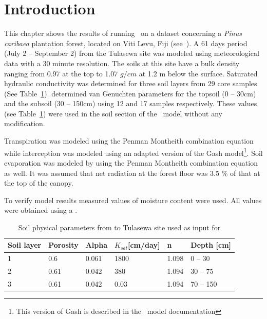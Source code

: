 \section{Introduction}
This chapter shows the results of running \vamps\ on a dataset
concerning a {\em Pinus caribaea} plantation forest, located on Viti
Levu, Fiji (see~). A 61 days period (July 2
-- September 2) from the Tulasewa site was modeled using
meteorological data with a 30 minute resolution. The soils at this
site have a bulk density ranging from 0.97 at the top to 1.07 $g/cm$
at 1.2 m below the surface. Saturated hydraulic conductivity was
determined for three soil layers from 29 core samples (See
Table~\ref{tab:tul-soil}).  determined van
Genuchten parameters for the topsoil (0 -- 30cm) and the subsoil (30
-- 150cm) using 12 and 17 samples respectively. These values (see
Table~\ref{tab:tul-soil}) were used in the soil section of the \vamps\
model without any modification.

Transpiration was modeled using the Penman Montheith combination
equation while interception was modeled using an adapted version of
the Gash model\footnote{This version of Gash is described in the
\vamps\ model documentation}. Soil evaporation was modeled by using
the Penman Montheith combination equation as well. It was assumed that
net radiation at the forest floor was 3.5 \% of that at the top
of the canopy. 


To verify model results measured values of moisture content were used.
All values were obtained using a \Index{capacitance probe}. 

\begin{table}
\begin{tabular}{llllll}\hline\hline
Soil layer & Porosity & Alpha & $K_{sat}$[cm/day] & n & Depth [cm] \\ \hline
1	& 0.6 & 0.061 & 1800 & 1.098 & 0 -- 30 \\
2	& 0.61 & 0.042 & 380 	& 1.094 & 30 -- 75 \\
3	& 0.61 & 0.042 & 0.03  & 1.094 & 70 -- 150 \\
\hline\hline
\end{tabular}
\label{tab:tul-soil}
\caption{Soil physical parameters from to Tulasewa site used as input 
for \vamps{}}
\end{table}



